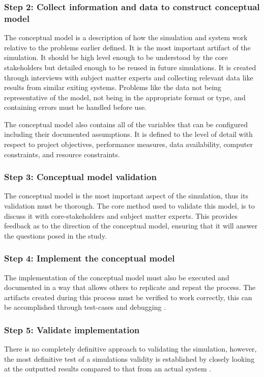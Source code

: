 \subsubsection{Step 2: Collect information and data to construct conceptual model}
The conceptual model is a description of how the simulation and system work relative to the problems earlier defined.
It is the most important artifact of the simulation.
It should be high level enough to be understood by the core stakeholders but detailed enough to be reused in future simulations.
It is created through interviews with subject matter experts and collecting relevant data like results from similar exiting systems.
Problems like the data not being representative of the model, not being in the appropriate format or type, and containing errors must be handled before use.

The conceptual model also contains all of the variables that can be configured including their documented assumptions. 
It is defined to the level of detail with respect to project objectives, performance measures, data availability, computer constraints, and resource constraints.

\subsubsection{Step 3: Conceptual model validation}
The conceptual model is the most important aspect of the simulation, thus its validation must be thorough.
The core method used to validate this model, is to discuss it with core-stakeholders and subject matter experts.
This provides feedback as to the direction of the conceptual model, ensuring that it will answer the questions posed in the study.

\subsubsection{Step 4: Implement the conceptual model}
The implementation of the conceptual model must also be executed and documented in a way that allows others to replicate and repeat the process.
The artifacts created during this process must be verified to work correctly, this can be accomplished through test-cases and debugging \citep{Pressman1992}.

\subsubsection{Step 5: Validate implementation}
There is no completely definitive approach to validating the simulation,
however, the most definitive test of a simulations validity is established by closely looking at the outputted results compared to that from an actual system \citep{Law2005}.

